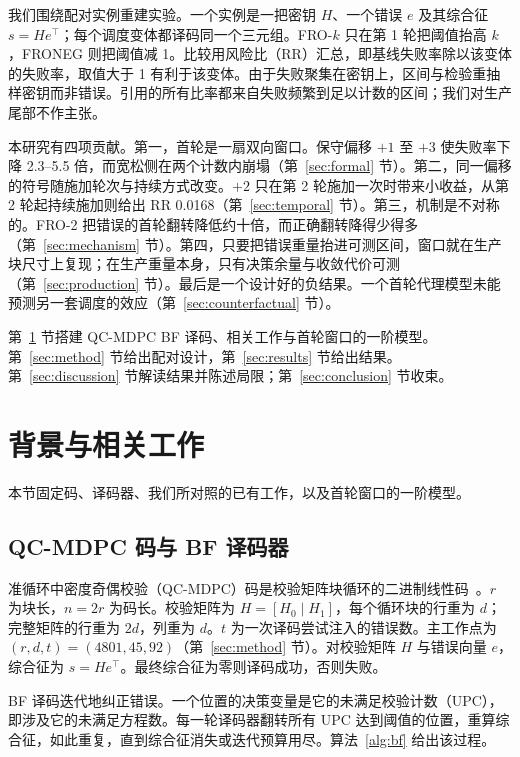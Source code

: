 \documentclass[UTF8,a4paper,10pt,twocolumn]{ctexart}
\begin{document}
我们围绕配对实例重建实验。一个实例是一把密钥 $H$、一个错误 $e$ 及其综合征 $s=He^{\top}$；每个调度变体都译码同一个三元组。FRO-$k$ 只在第 1 轮把阈值抬高 $k$，FRONEG 则把阈值减 1。比较用风险比（RR）汇总，即基线失败率除以该变体的失败率，取值大于 1 有利于该变体。由于失败聚集在密钥上，区间与检验重抽样密钥而非错误。引用的所有比率都来自失败频繁到足以计数的区间；我们对生产尾部不作主张。

本研究有四项贡献。第一，首轮是一扇双向窗口。保守偏移 $+1$ 至 $+3$ 使失败率下降 2.3--5.5 倍，而宽松侧在两个计数内崩塌（第~\ref{sec:formal} 节）。第二，同一偏移的符号随施加轮次与持续方式改变。$+2$ 只在第 2 轮施加一次时带来小收益，从第 2 轮起持续施加则给出 RR 0.0168（第~\ref{sec:temporal} 节）。第三，机制是不对称的。FRO-2 把错误的首轮翻转降低约十倍，而正确翻转降得少得多（第~\ref{sec:mechanism} 节）。第四，只要把错误重量抬进可测区间，窗口就在生产块尺寸上复现；在生产重量本身，只有决策余量与收敛代价可测（第~\ref{sec:production} 节）。最后是一个设计好的负结果。一个首轮代理模型未能预测另一套调度的效应（第~\ref{sec:counterfactual} 节）。

第~\ref{sec:background} 节搭建 QC-MDPC BF 译码、相关工作与首轮窗口的一阶模型。第~\ref{sec:method} 节给出配对设计，第~\ref{sec:results} 节给出结果。第~\ref{sec:discussion} 节解读结果并陈述局限；第~\ref{sec:conclusion} 节收束。
\section{背景与相关工作}\label{sec:background}

本节固定码、译码器、我们所对照的已有工作，以及首轮窗口的一阶模型。

\subsection{QC-MDPC 码与 BF 译码器}

准循环中密度奇偶校验（QC-MDPC）码是校验矩阵块循环的二进制线性码~\cite{misoczki2013mdpc}。$r$ 为块长，$n=2r$ 为码长。校验矩阵为 $H=[H_0\mid H_1]$，每个循环块的行重为 $d$；完整矩阵的行重为 $2d$，列重为 $d$。$t$ 为一次译码尝试注入的错误数。主工作点为 $(r,d,t)=(4801,45,92)$（第~\ref{sec:method} 节）。对校验矩阵 $H$ 与错误向量 $e$，综合征为 $s=He^{\top}$。最终综合征为零则译码成功，否则失败。

BF 译码迭代地纠正错误。一个位置的决策变量是它的未满足校验计数（UPC），即涉及它的未满足方程数。每一轮译码器翻转所有 UPC 达到阈值的位置，重算综合征，如此重复，直到综合征消失或迭代预算用尽。算法~\ref{alg:bf} 给出该过程。
\end{document}

